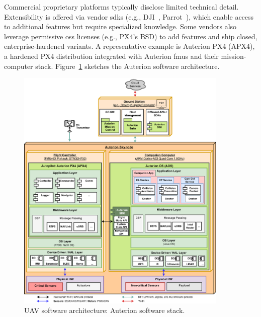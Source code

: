 Commercial proprietary platforms typically disclose limited technical detail. 
Extensibility is offered via vendor \glspl{sdk} (e.g., DJI~\cite{djiSDK}, Parrot~\cite{parrot-sdk}), 
which enable access to additional features but require specialized knowledge.
%
Some vendors also leverage permissive \gls{oss} licenses (e.g., PX4’s BSD) to
add features and ship closed, enterprise-hardened variants.
A representative example is Auterion PX4 (APX4), a hardened PX4 distribution integrated with Auterion \glspl{fmu} and their mission-computer stack. 
Figure~\ref{fig:uav-sw-arch-auterion} sketches the Auterion software architecture.

\begin{figure}[!hbt]
  \centering
  \includegraphics[width=0.9\textwidth]{./img/pdf/uav-main-sw-arch-auterion.pdf}
  \caption{UAV software architecture: Auterion software stack.}
  \label{fig:uav-sw-arch-auterion}
\end{figure}

